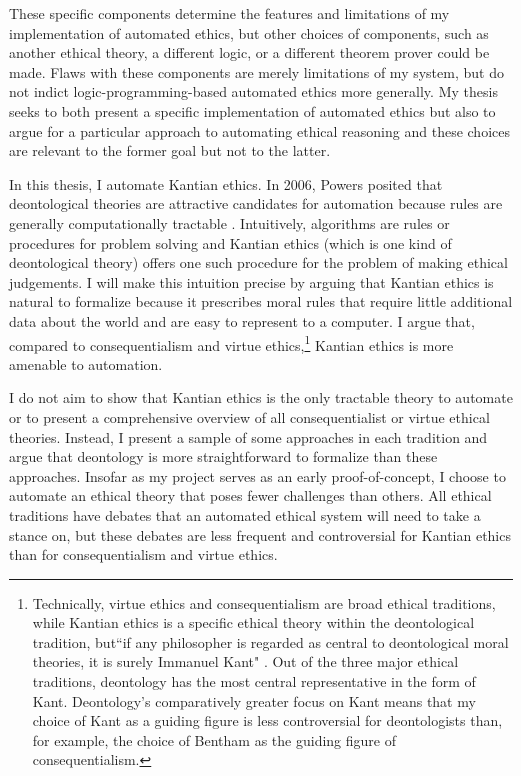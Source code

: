 \begin{isabellebody}
\begin{isamarkuptext}
These specific components determine the features
and limitations of my implementation of automated ethics, but other choices of 
components, such as another ethical theory, a different logic, or a different theorem prover could be 
made. Flaws with these components are merely limitations of my system, but do not 
indict logic-programming-based automated ethics more generally. My thesis seeks to 
both present a specific implementation of automated ethics but also to argue for a particular approach 
to automating ethical reasoning and these choices are relevant to the former goal but not to the latter.%
\end{isamarkuptext}\isamarkuptrue%
%
\isadelimdocument
%
\endisadelimdocument
%
\isatagdocument
%
\isamarkuptrue%
%
\endisatagdocument
{\isafolddocument}%
%
\isadelimdocument
%
\endisadelimdocument
%
\begin{isamarkuptext}%
In this thesis, I automate Kantian ethics. In 2006, Powers posited that deontological theories are 
attractive candidates for automation because rules are generally computationally tractable \cite[1]{powers}. 
Intuitively, algorithms are rules or procedures for problem solving and Kantian ethics (which is one kind 
of deontological theory) offers one such 
procedure for the problem of making ethical judgements. I will make this intuition precise by
arguing that Kantian ethics is natural to formalize because it prescribes moral rules that require 
little additional data about the world and are easy to represent to a computer. I argue that, compared to 
consequentialism and virtue ethics,\footnote{Technically, virtue ethics and
consequentialism are broad ethical traditions, while Kantian ethics is a specific ethical theory within
the deontological tradition, but``if any philosopher is regarded as central
to deontological moral theories, it is surely Immanuel Kant" \citep{sepdeont}. Out of the three major ethical
traditions, deontology has the most central representative in the form of Kant. Deontology's comparatively 
greater focus on Kant means that my choice of Kant as a guiding figure is less controversial for deontologists 
than, for example, the choice of Bentham as the guiding figure of consequentialism.} Kantian ethics is 
more amenable to automation.

I do not aim to show that Kantian ethics is the only tractable theory to automate or
to present a comprehensive overview of all consequentialist or virtue ethical theories. Instead, I 
present a sample of some approaches in each tradition and argue that deontology is more straightforward 
to formalize than these approaches. Insofar as my project serves 
as an early proof-of-concept, I choose to automate an ethical theory that 
poses fewer challenges than others. All ethical traditions have debates that an 
automated ethical system will need to take a stance on, but these debates are less frequent and controversial
for Kantian ethics than for consequentialism and virtue ethics.


\end{isamarkuptext}
\end{isabellebody}
